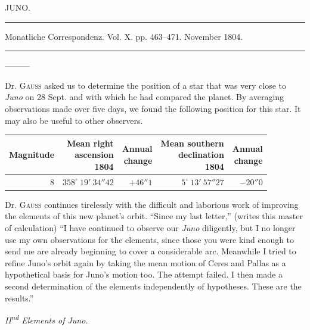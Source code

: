 \clearpage
{}
\hypertarget{native-261-lower}{}
\begin{center}
JUNO.

\rule{0.75\linewidth}{0.4pt}

Monatliche Correspondenz. Vol. X. pp. 463–471. November 1804.

\rule{0.75\linewidth}{0.4pt}
\end{center}

\noindent—\quad—\quad—\par
Dr. \textsc{Gauss} asked us to determine the position of a star that was very close to \emph{Juno} on 28 Sept. and with which he had compared the planet. By averaging observations made over five days, we found the following position for this star. It may also be useful to other observers.

\begin{center}
\begingroup\fontsize{9}{11}\selectfont\setlength{\tabcolsep}{3pt}\renewcommand{\arraystretch}{1.1}
\begin{tabular}{r|r|r|r|r}
Magnitude & \shortstack{Mean right\\ascension\\1804} & \shortstack{Annual\\change} & \shortstack{Mean southern\\declination\\1804} & \shortstack{Annual\\change}\\ \hline
8 & $358^\circ\ 19'\ 34''42$ & $+46''1$ & $5^\circ\ 13'\ 57''27$ & $-20''0$ \\
\end{tabular}\endgroup
\end{center}


Dr. \textsc{Gauss} continues tirelessly with the difficult and laborious work of improving the elements of this new planet’s orbit. “Since my last letter,” (writes this master of calculation) “I have continued to observe our \emph{Juno} diligently, but I no longer use my own observations for the elements, since those you were kind enough to send me are already beginning to cover a considerable arc. Meanwhile I tried to refine Juno’s orbit again by taking the mean motion of Ceres and Pallas as a hypothetical basis for Juno’s motion too. The attempt failed. I then made a second determination of the elements independently of hypotheses. These are the results.”

\begin{center}
\emph{II\textsuperscript{nd} Elements of Juno.}
\end{center}

